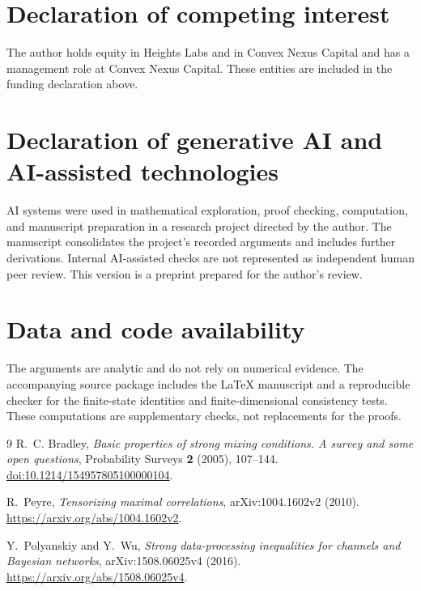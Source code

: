 \documentclass[11pt]{amsart}
\numberwithin{equation}{section}
\theoremstyle{definition}
\begin{document}
\section*{Declaration of competing interest}
The author holds equity in Heights Labs and in Convex Nexus Capital and has a management role at Convex Nexus Capital. These entities are included in the funding declaration above.

\section*{Declaration of generative AI and AI-assisted technologies}
AI systems were used in mathematical exploration, proof checking, computation, and manuscript preparation in a research project directed by the author. The manuscript consolidates the project's recorded arguments and includes further derivations. Internal AI-assisted checks are not represented as independent human peer review. This version is a preprint prepared for the author's review.

\section*{Data and code availability}
The arguments are analytic and do not rely on numerical evidence. The accompanying source package includes the \LaTeX{} manuscript and a reproducible checker for the finite-state identities and finite-dimensional consistency tests. These computations are supplementary checks, not replacements for the proofs.

\begin{thebibliography}{9}
R.~C. Bradley, \emph{Basic properties of strong mixing conditions. A survey and some open questions}, Probability Surveys \textbf{2} (2005), 107--144. \href{https://doi.org/10.1214/154957805100000104}{doi:10.1214/154957805100000104}.

R.~Peyre, \emph{Tensorizing maximal correlations}, arXiv:1004.1602v2 (2010). \url{https://arxiv.org/abs/1004.1602v2}.

Y.~Polyanskiy and Y.~Wu, \emph{Strong data-processing inequalities for channels and Bayesian networks}, arXiv:1508.06025v4 (2016). \url{https://arxiv.org/abs/1508.06025v4}.
\end{thebibliography}
\end{document}
